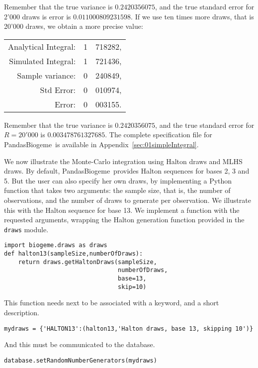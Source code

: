 \documentclass[12pt,a4paper]{article}
\newcommand{\PBIOGEME}{PandasBiogeme}
\begin{document}
Remember that the true variance is $0.2420356075$, and the true
standard error for 2'000 draws is
error is $0.011000809231598$.
If we use ten times more draws, that is 20'000 draws, we obtain a
more precise value:
\begin{center}
\begin{tabular}{rr@{.}l}
Analytical Integral: & 1&718282, \\
Simulated Integral: & 1&721436, \\
Sample variance: & 0&240849, \\
Std Error: & 0&010974, \\
Error: &0&003155.
\end{tabular}
\end{center}
Remember that the true variance is $0.2420356075$, and the true standard
error  for $R=20'000$  is $0.003478761327685$.
The complete specification file for \PBIOGEME\ is available in Appendix~\ref{sec:01simpleIntegral}.

We now illustrate the Monte-Carlo integration using Halton draws and
MLHS draws. By default, \PBIOGEME\ provides Halton sequences for bases
2, 3 and 5. But the user can also specify her own draws, by
implementing a Python function that takes two arguments:
the sample size, that is, the number of observations, and the number
of draws to generate per observation.  We illustrate
this with the Halton sequence for base 13. We implement a function
with the requested arguments, wrapping the Halton generation
function provided in the \lstinline$draws$ module.

\begin{lstlisting}
import biogeme.draws as draws
def halton13(sampleSize,numberOfDraws):
    return draws.getHaltonDraws(sampleSize,
                                numberOfDraws,
                                base=13,
                                skip=10)
\end{lstlisting}

This function needs next to be associated with a keyword, and a short
description.

\begin{lstlisting}
mydraws = {'HALTON13':(halton13,'Halton draws, base 13, skipping 10')}
\end{lstlisting}
And this must be communicated to the database.
\begin{lstlisting}
database.setRandomNumberGenerators(mydraws)
\end{lstlisting}
\end{document}
